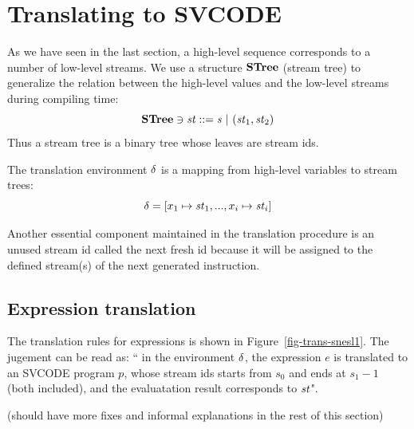 \section{Translating \mysnesl to SVCODE}
As we have seen in the last section, a high-level sequence corresponds to a number of low-level streams.
We use a structure $\mathbf{STree}$ (stream tree) to generalize the relation between the high-level values and the low-level streams during compiling time:
$$ \STree \ni \st ::= \s \ | \ (\st_1,\st_2) $$
Thus a stream tree is a binary tree whose leaves are stream ids.  

The translation environment $\delta$ is a mapping from high-level variables to stream trees:
 $$\del = [x_1 \|-> \st_1,..., x_i \|-> {\st_i}] $$ 

Another essential component maintained in the translation procedure is an unused stream id called the next fresh id because it will be assigned to the defined stream(s) of the next generated instruction.

\subsection{Expression translation}

%	
The translation rules for \mysnesl expressions is shown in Figure~\ref{fig-trans-snesl1}. 
The jugement can be read as: `` in the environment $\delta$, the expression $e$ is translated to an SVCODE program $p$, whose stream ids starts from $s_0$ and ends at $s_1-1$ (both included), and the evaluatation result corresponds to $\mathit{st}$". 


(should have more fixes and informal explanations in the rest of this section)

